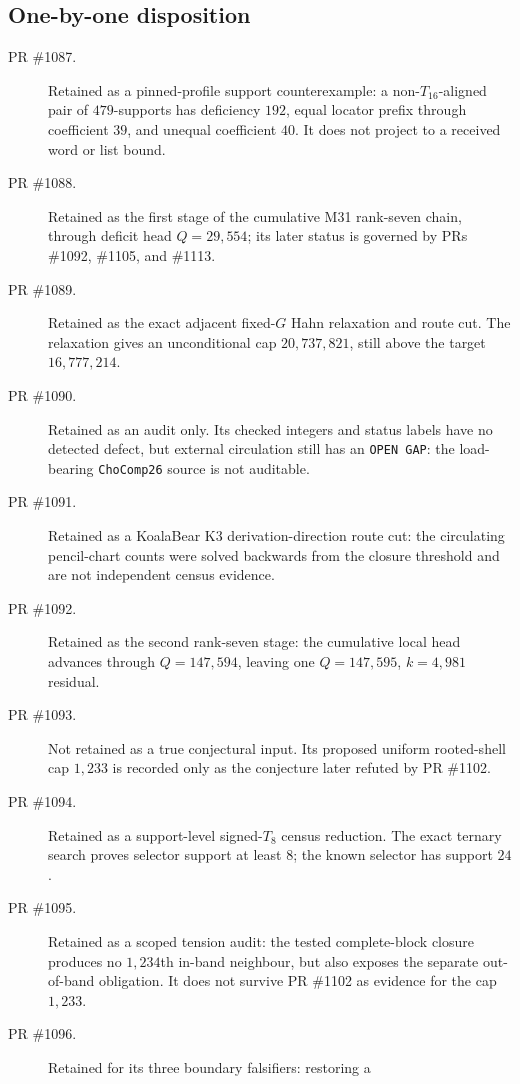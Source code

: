 \documentclass[11pt]{article}
\begin{document}
\subsection{One-by-one disposition}

\begin{description}
\item[PR \#1087.] Retained as a pinned-profile support counterexample:
  a non-\(T_{16}\)-aligned pair of \(479\)-supports has deficiency \(192\),
  equal locator prefix through coefficient \(39\), and unequal coefficient
  \(40\).  It does not project to a received word or list bound.
\item[PR \#1088.] Retained as the first stage of the cumulative M31 rank-seven
  chain, through deficit head \(Q=29{,}554\); its later status is governed by
  PRs \#1092, \#1105, and \#1113.
\item[PR \#1089.] Retained as the exact adjacent fixed-\(G\) Hahn relaxation
  and route cut.  The relaxation gives an unconditional cap
  \(20{,}737{,}821\), still above the target \(16{,}777{,}214\).
\item[PR \#1090.] Retained as an audit only.  Its checked integers and status
  labels have no detected defect, but external circulation still has an
  \texttt{OPEN GAP}: the load-bearing \texttt{ChoComp26} source is not
  auditable.
\item[PR \#1091.] Retained as a KoalaBear K3 derivation-direction route cut:
  the circulating pencil-chart counts were solved backwards from the closure
  threshold and are not independent census evidence.
\item[PR \#1092.] Retained as the second rank-seven stage: the cumulative local
  head advances through \(Q=147{,}594\), leaving one \(Q=147{,}595\),
  \(k=4{,}981\) residual.
\item[PR \#1093.] Not retained as a true conjectural input.  Its proposed
  uniform rooted-shell cap \(1{,}233\) is recorded only as the conjecture later
  refuted by PR \#1102.
\item[PR \#1094.] Retained as a support-level signed-\(T_8\) census reduction.
  The exact ternary search proves selector support at least \(8\); the known
  selector has support \(24\).
\item[PR \#1095.] Retained as a scoped tension audit: the tested complete-block
  closure produces no \(1{,}234\)th in-band neighbour, but also exposes the
  separate out-of-band obligation.  It does not survive PR \#1102 as evidence
  for the cap \(1{,}233\).
\item[PR \#1096.] Retained for its three boundary falsifiers: restoring a

\end{description}
\end{document}
